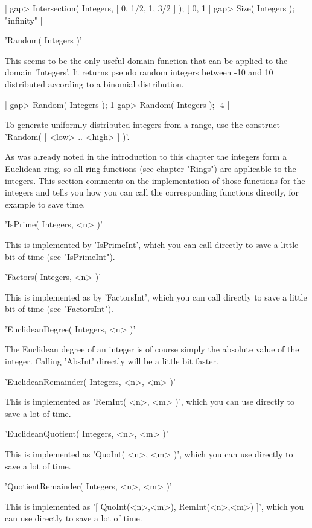 |    gap> Intersection( Integers, [ 0, 1/2, 1, 3/2 ] );
    [ 0, 1 ]
    gap> Size( Integers );
    "infinity" |

'Random( Integers )'

This seems to be the only useful  domain function that can  be applied to
the domain 'Integers'.  It returns pseudo random integers between -10 and
10 distributed according to a binomial distribution.

|    gap> Random( Integers );
    1
    gap> Random( Integers );
    -4 |

To  generate  uniformly  distributed  integers from   a  range,  use  the
construct 'Random( [ <low> .. <high> ] )'.


As was already noted  in the introduction  to this  chapter  the integers
form  a Euclidean ring, so all  ring functions (see chapter "Rings")  are
applicable to the integers.   This section comments on the implementation
of those functions  for  the integers and tells you how  you can call the
corresponding functions directly, for example to save time.

'IsPrime( Integers, <n> )'

This is implemented by 'IsPrimeInt', which you can  call directly to save
a little bit of time (see "IsPrimeInt").

'Factors( Integers, <n> )'

This is  implemented as by 'FactorsInt', which  you  can call directly to
save a little bit of time (see "FactorsInt").

'EuclideanDegree( Integers, <n> )'

The Euclidean degree of an integer is of course simply the absolute value
of the integer.  Calling 'AbsInt' directly will be a little bit faster.

'EuclideanRemainder( Integers, <n>, <m> )'

This  is implemented as 'RemInt( <n>, <m> )', which you can use  directly
to save a lot of time.

'EuclideanQuotient( Integers, <n>, <m> )'

This is  implemented as 'QuoInt( <n>, <m> )', which you can use  directly
to save a lot of time.

'QuotientRemainder( Integers, <n>, <m> )'

This is implemented as '[ QuoInt(<n>,<m>),  RemInt(<n>,<m>) ]', which you
can use directly to save a lot of time.

